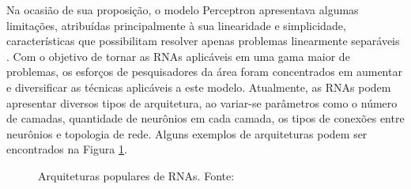 Na ocasião de sua proposição, o modelo Perceptron apresentava algumas limitações, atribuídas principalmente à sua linearidade e simplicidade, características que possibilitam resolver apenas problemas linearmente separáveis \cite{Teresa:Livro}. Com o objetivo de tornar as RNAs aplicáveis em uma gama maior de problemas, os esforços de pesquisadores da área foram concentrados em aumentar e diversificar as técnicas aplicáveis a este modelo. Atualmente, as RNAs podem apresentar diversos tipos de arquitetura, ao variar-se parâmetros como o número de camadas, quantidade de neurônios em cada camada, os tipos de conexões entre neurônios e topologia de rede. Alguns exemplos de arquiteturas podem ser encontrados na Figura \ref{fig:popular_archs}.

\begin{figure}[!ht]
	\caption{Arquiteturas populares de RNAs. Fonte: \cite{rnas_tipos}}
	\label{fig:popular_archs}


\end{figure}
